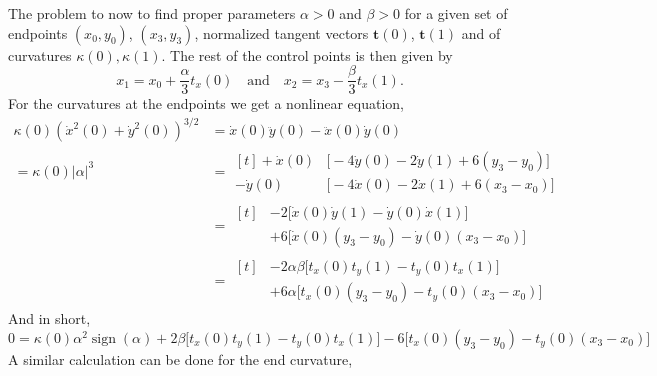 \documentclass{article}
\newcommand{\sign}{\operatorname{sign}}
\begin{document}
The problem to now to find proper parameters $\alpha>0$ and $\beta>0$ for a given set of
endpoints $(x_0,y_0)$, $(x_3, y_3)$,
normalized tangent vectors $\mathbf{t}(0)$, $\mathbf{t}(1)$ and of
curvatures $\kappa(0), \kappa(1)$.
The rest of the control points is then given by
%
\begin{equation}
  x_1 = x_0 + \frac{\alpha}{3} t_x(0) \quad\text{and}\quad
  x_2 = x_3 - \frac{\beta}{3} t_x(1).
\end{equation}
%
For the curvatures at the endpoints we get a nonlinear equation,
%
\begin{align}
  \kappa(0) (\dot x^2(0) + \dot y^2(0))^{3/2}
  &= \dot x(0) \ddot y(0) - \ddot x(0) \dot y(0) \\
  = \kappa(0) |\alpha|^3
  &= \begin{aligned}[t]
      +\dot x(0) &\bigl[- 4\dot y(0) - 2\dot y(1) + 6(y_3-y_0)\bigr] \\
      -\dot y(0) &\bigl[- 4\dot x(0) - 2\dot x(1) + 6(x_3-x_0)\bigr]
     \end{aligned}\\
  &= \begin{aligned}[t]
      &-2 \bigl[\dot x(0) \dot y(1) - \dot y(0)\dot x(1)\bigr] \\
      &+6 \bigl[\dot x(0) (y_3-y_0) - \dot y(0) (x_3-x_0)\bigr]
     \end{aligned}\\
  &= \begin{aligned}[t]
      &-2 \alpha\beta \bigl[t_x(0)t_y(1) - t_y(0)t_x(1)\bigr] \\
      &+6 \alpha \bigl[t_x(0) (y_3-y_0) - t_y(0) (x_3-x_0)\bigr]
     \end{aligned}
\end{align}
%
And in short,
%
\begin{equation}
  0 = \kappa(0) \alpha^2 \sign(\alpha)
    + 2\beta \bigl[t_x(0)t_y(1) - t_y(0)t_x(1)\bigr]
    - 6 \bigl[t_x(0) (y_3-y_0) - t_y(0) (x_3-x_0)\bigr]
\end{equation}
%
A similar calculation can be done for the end curvature,
%
\end{document}
